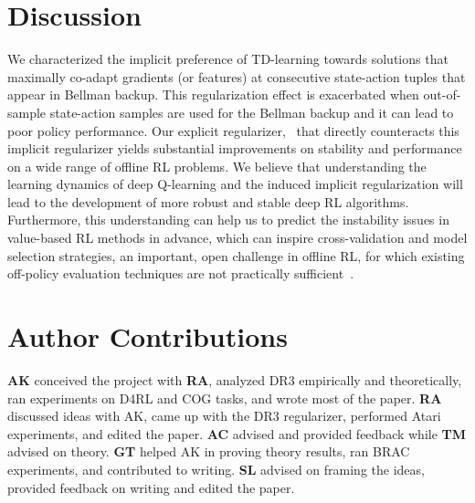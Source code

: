\documentclass{article}
\begin{document}
\section{Discussion}
\label{sec:discussion}
We characterized the implicit preference of TD-learning towards solutions that maximally co-adapt gradients (or features) at consecutive state-action tuples that appear in Bellman backup. This regularization effect is exacerbated when out-of-sample
state-action samples are used for the Bellman backup and it can lead to poor policy performance. Our explicit regularizer, \methodname\ that directly counteracts this implicit regularizer yields substantial improvements on stability and performance on a wide range of offline RL problems. We believe that understanding the learning dynamics of deep Q-learning and the induced implicit regularization will lead to the development of more robust and stable deep RL algorithms. Furthermore, this understanding can help us to predict the instability issues in value-based RL methods in advance, which can inspire cross-validation and model selection strategies, an important, open challenge in offline RL, for which existing off-policy evaluation techniques are not practically sufficient~\citep{fu2021benchmarks}. 

\section*{Author Contributions}
\textbf{AK} conceived the project with \textbf{RA}, analyzed DR3 empirically and theoretically, ran experiments on D4RL and COG tasks, and wrote most of the paper. \textbf{RA} discussed ideas with AK, came up with the DR3 regularizer, performed Atari experiments, and edited the paper. \textbf{AC} advised and provided feedback while \textbf{TM} advised on theory. \textbf{GT} helped AK in proving theory results, ran BRAC experiments, and contributed to writing. \textbf{SL} advised on framing the ideas, provided feedback on writing and edited the paper.
\end{document}
